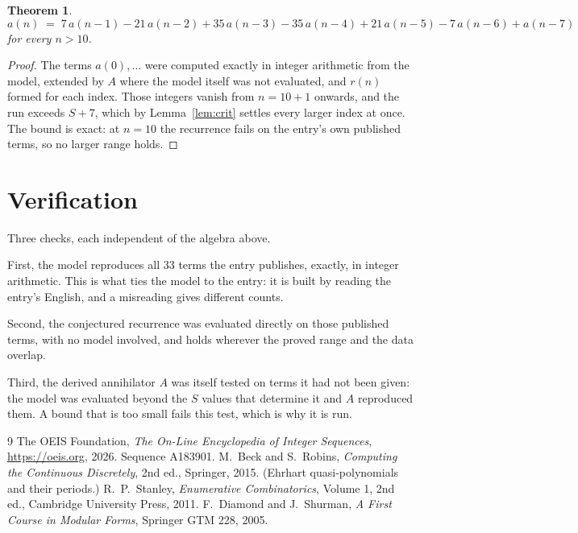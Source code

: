 \documentclass[11pt,a4paper]{article}
\theoremstyle{plain}
\newtheorem{theorem}{Theorem}
\theoremstyle{definition}
\begin{document}
\begin{theorem}
\[
a(n)\;=\;7\,a(n-1) - 21\,a(n-2) + 35\,a(n-3) - 35\,a(n-4) + 21\,a(n-5) - 7\,a(n-6) + a(n-7)
\]
for every $n>10$.
\end{theorem}

\begin{proof}
The terms $a(0),\dots$ were computed exactly in integer arithmetic from the model, extended by
$A$ where the model itself was not evaluated, and $r(n)$ formed for each index. Those integers
vanish from $n=10+1$ onwards, and the run exceeds $S+7$, which by
Lemma~\ref{lem:crit} settles every larger index at once. The bound is exact: at $n=10$ the recurrence fails on the entry's own published terms, so no larger range holds.
\end{proof}

\section{Verification}

Three checks, each independent of the algebra above.

First, the model reproduces all $33$ terms the entry publishes, exactly, in integer
arithmetic. This is what ties the model to the entry: it is built by reading the entry's
English, and a misreading gives different counts.

Second, the conjectured recurrence was evaluated directly on those published terms, with no
model involved, and holds wherever the proved range and the data overlap.

Third, the derived annihilator $A$ was itself tested on terms it had not been given: the model
was evaluated beyond the $S$ values that determine it and $A$ reproduced them. A bound that is
too small fails this test, which is why it is run.

\begin{thebibliography}{9}
 The OEIS Foundation, \emph{The On-Line Encyclopedia of Integer
Sequences}, \url{https://oeis.org}, 2026. Sequence A183901.
 M.~Beck and S.~Robins, \emph{Computing the Continuous Discretely},
2nd ed., Springer, 2015. (Ehrhart quasi-polynomials and their periods.)
 R.~P.~Stanley, \emph{Enumerative Combinatorics}, Volume 1, 2nd ed.,
Cambridge University Press, 2011.
 F.~Diamond and J.~Shurman, \emph{A First Course in Modular Forms},
Springer GTM 228, 2005.
\end{thebibliography}
\end{document}
